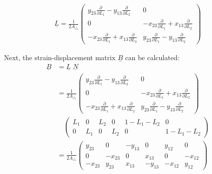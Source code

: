   \begin{align}
  \underline{L} = \frac{1}{2 A_\triangle} \begin{pmatrix}
  y_{23}\frac{\partial}{\partial L_1} - y_{13}\frac{\partial}{\partial L_2} & 0 \\
  0 & -x_{23}\frac{\partial}{\partial L_1} + x_{13}\frac{\partial}{\partial L_2} \\
  -x_{23}\frac{\partial}{\partial L_1} + x_{13}\frac{\partial}{\partial L_2} & y_{23}\frac{\partial}{\partial L_1} - y_{13}\frac{\partial}{\partial L_2}
  \end{pmatrix}
  \end{align}
  
  Next, the strain-displacement matrix $\underline{B}$ can be calculated:
  \begin{align}
  \underline{B} &= \underline{L}\; \underline{N} \nonumber\\
  &= \frac{1}{2 A_\triangle} \begin{pmatrix}
  y_{23}\frac{\partial}{\partial L_1} - y_{13}\frac{\partial}{\partial L_2} & 0 \\
  0 & -x_{23}\frac{\partial}{\partial L_1} + x_{13}\frac{\partial}{\partial L_2} \\
  -x_{23}\frac{\partial}{\partial L_1} + x_{13}\frac{\partial}{\partial L_2} & y_{23}\frac{\partial}{\partial L_1} - y_{13}\frac{\partial}{\partial L_2}
  \end{pmatrix} \nonumber\\
  & \quad \begin{pmatrix}
  L_1 & 0 & L_2 & 0 & 1-L_1-L_2 & 0 \\
  0 & L_1 & 0 & L_2 & 0 & 1-L_1-L_2
  \end{pmatrix} \nonumber\\
  &= \frac{1}{2 A_\triangle} \begin{pmatrix}
  y_{23} & 0 & -y_{13} & 0 & y_{12} & 0 \\
  0 & -x_{23} & 0 & x_{13} & 0 & -x_{12} \\
  -x_{23} & y_{23} & x_{13} & -y_{13} & -x_{12} & y_{12}
  \end{pmatrix}
  \end{align}
  
